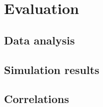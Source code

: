 \section{Evaluation} \label{sec:eva}




\subsection{Data analysis}

\subsection{Simulation results}

\subsection{Correlations}
